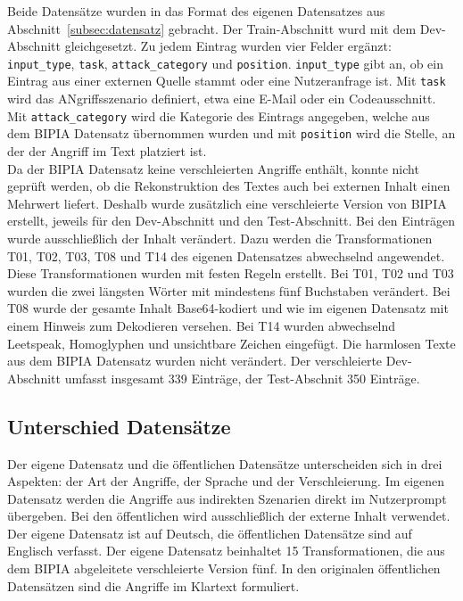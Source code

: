 Beide Datensätze wurden in das Format des eigenen Datensatzes aus Abschnitt~\ref{subsec:datensatz} gebracht. Der Train-Abschnitt wurd mit dem Dev-Abschnitt 
gleichgesetzt. Zu jedem Eintrag wurden vier Felder ergänzt: \texttt{input\_type}, \texttt{task}, \texttt{attack\_category} und \texttt{position}. \texttt{input\_type}
gibt an, ob ein Eintrag aus einer externen Quelle stammt oder eine Nutzeranfrage ist. Mit \texttt{task} wird das ANgriffsszenario definiert, etwa eine E-Mail oder
ein Codeausschnitt. Mit \texttt{attack\_category} wird die Kategorie des Eintrags angegeben, welche aus dem BIPIA Datensatz übernommen wurden und mit \texttt{position}
wird die Stelle, an der der Angriff im Text platziert ist. \\
Da der BIPIA Datensatz keine verschleierten Angriffe enthält, konnte nicht geprüft werden, ob die Rekonstruktion des Textes auch bei externen Inhalt einen Mehrwert
liefert. Deshalb wurde zusätzlich eine verschleierte Version von BIPIA erstellt, jeweils für den Dev-Abschnitt und den Test-Abschnitt. Bei den Einträgen wurde ausschließlich
der Inhalt verändert. Dazu werden die Transformationen T01, T02, T03, T08 und T14 des eigenen Datensatzes abwechselnd angewendet. Diese Transformationen wurden mit festen Regeln erstellt. Bei T01, T02 und T03 wurden die zwei längsten Wörter mit mindestens fünf 
Buchstaben verändert. Bei T08 wurde der gesamte Inhalt Base64-kodiert und wie im eigenen Datensatz mit einem Hinweis zum Dekodieren versehen. Bei T14 wurden 
abwechselnd Leetspeak, Homoglyphen und unsichtbare Zeichen eingefügt. Die harmlosen Texte aus dem BIPIA Datensatz wurden nicht verändert. Der verschleierte 
Dev-Abschnitt umfasst insgesamt 339 Einträge, der Test-Abschnit 350 Einträge.

\subsection{Unterschied Datensätze}

Der eigene Datensatz und die öffentlichen Datensätze unterscheiden sich in drei Aspekten: der Art der Angriffe, der Sprache und der Verschleierung. Im eigenen Datensatz
werden die Angriffe aus indirekten Szenarien direkt im Nutzerprompt übergeben. Bei den öffentlichen wird ausschließlich der externe Inhalt verwendet.
Der eigene Datensatz ist auf Deutsch, die öffentlichen Datensätze sind auf Englisch verfasst. Der eigene Datensatz beinhaltet 15 Transformationen, die aus dem BIPIA abgeleitete 
verschleierte Version fünf. In den originalen öffentlichen Datensätzen sind die Angriffe im Klartext formuliert.

